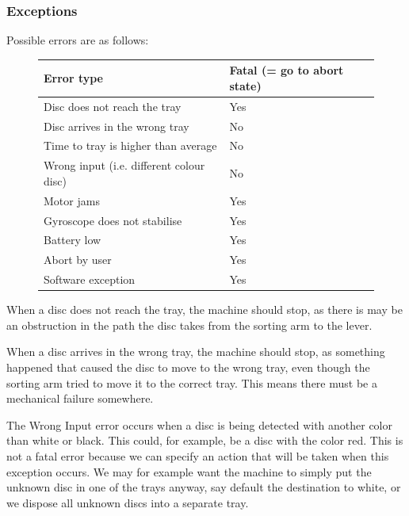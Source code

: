 \documentclass[a4paper,oneside,11pt]{article}
\begin{document}
\subsubsection{Exceptions}
Possible errors are as follows:
\begin{figure}[H]
\centering
\begin{tabular}{|l|l|}
\hline
Error type & Fatal (= go to abort state)\\\hline
Disc does not reach the tray & Yes\\\hline
Disc arrives in the wrong tray & No\\\hline
Time to tray is higher than average & No\\\hline
Wrong input (i.e. different colour disc) & No\\\hline
Motor jams & Yes \\\hline
Gyroscope does not stabilise & Yes \\\hline
Battery low & Yes \\\hline
Abort by user & Yes \\\hline
Software exception & Yes \\\hline
\end{tabular}
\end{figure}
When a disc does not reach the tray, the machine should stop, as there is may be an
obstruction in the path the disc takes from the sorting arm to the lever.

When a disc arrives in the wrong tray, the machine should stop, as something happened
that caused the disc to move to the wrong tray, even though the sorting arm tried to move
it to the correct tray. This means there must be a mechanical failure somewhere.

The Wrong Input error occurs when a disc is being detected with another color than white
or black. This could, for example, be a disc with the color red. This is not a fatal error because
we can specify an action that will be taken when this exception occurs. We may for example
want the machine to simply put the unknown disc in one of the trays anyway, say default the
destination to white, or we dispose all unknown discs into a separate tray.

\end{document}
